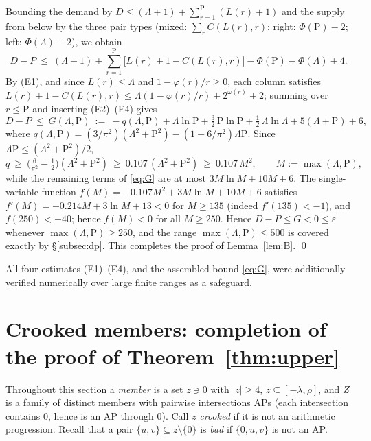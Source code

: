 \documentclass[11pt]{article}
\theoremstyle{definition}
\begin{document}
Bounding the demand by $D\le(\Lambda+1)+\sum_{r=1}^{\mathrm{P}}(L(r)+1)$ and the supply from below by the three pair types (mixed: $\sum_r C(L(r),r)$; right: $\Phi(\mathrm{P})-2$; left: $\Phi(\Lambda)-2$), we obtain
\[ D-P\ \le\ (\Lambda+1)+\sum_{r=1}^{\mathrm{P}}\bigl[L(r)+1-C(L(r),r)\bigr]-\Phi(\mathrm{P})-\Phi(\Lambda)+4 .\]
By (E1), and since $L(r)\le\Lambda$ and $1-\varphi(r)/r\ge0$, each column satisfies $L(r)+1-C(L(r),r)\le \Lambda(1-\varphi(r)/r)+2^{\omega(r)}+2$; summing over $r\le\mathrm{P}$ and inserting (E2)--(E4) gives
\begin{equation}\label{eq:G}
 D-P\ \le\ G(\Lambda,\mathrm{P})\ :=\ -q(\Lambda,\mathrm{P})+\Lambda\ln \mathrm{P}+\tfrac32\,\mathrm{P}\ln \mathrm{P}+\tfrac12\,\Lambda\ln\Lambda+5(\Lambda+\mathrm{P})+6,
\end{equation}
where $q(\Lambda,\mathrm{P})=(3/\pi^2)(\Lambda^2+\mathrm{P}^2)-(1-6/\pi^2)\Lambda \mathrm{P}$. Since $\Lambda \mathrm{P}\le(\Lambda^2+\mathrm{P}^2)/2$,
\[ q\ \ge\ \Big(\tfrac{6}{\pi^2}-\tfrac12\Big)(\Lambda^2+\mathrm{P}^2)\ \ge\ 0.107\,(\Lambda^2+\mathrm{P}^2)\ \ge\ 0.107\,M^2, \qquad M:=\max(\Lambda,\mathrm{P}), \]
while the remaining terms of \eqref{eq:G} are at most $3M\ln M+10M+6$. The single-variable function $f(M)=-0.107M^2+3M\ln M+10M+6$ satisfies $f'(M)=-0.214M+3\ln M+13<0$ for $M\ge 135$ (indeed $f'(135)<-1$), and $f(250)<-40$; hence $f(M)<0$ for all $M\ge 250$. Hence $D-P\le G<0\le\varepsilon$ whenever $\max(\Lambda,\mathrm{P})\ge 250$, and the range $\max(\Lambda,\mathrm{P})\le 500$ is covered exactly by \S\ref{subsec:dp}. This completes the proof of Lemma~\ref{lem:B}. \qed

\medskip
All four estimates (E1)--(E4), and the assembled bound \eqref{eq:G}, were additionally verified numerically over large finite ranges as a safeguard.

\section{Crooked members: completion of the proof of Theorem~\ref{thm:upper}}\label{sec:crooked}

Throughout this section a \emph{member} is a set $z\ni 0$ with $|z|\ge 4$, $z\subseteq[-\lambda,\rho]$, and $Z$ is a family of distinct members with pairwise intersections APs (each intersection contains $0$, hence is an AP through $0$). Call $z$ \emph{crooked} if it is not an arithmetic progression. Recall that a pair $\{u,v\}\subseteq z\setminus\{0\}$ is \emph{bad} if $\{0,u,v\}$ is not an AP.
\end{document}
